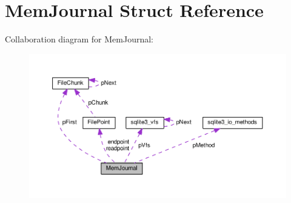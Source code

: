\hypertarget{structMemJournal}{}\section{Mem\+Journal Struct Reference}
\label{structMemJournal}


Collaboration diagram for Mem\+Journal\+:\nopagebreak
\begin{figure}[H]
\begin{center}
\leavevmode
\includegraphics[width=350pt]{structMemJournal__coll__graph}
\end{center}
\end{figure}
